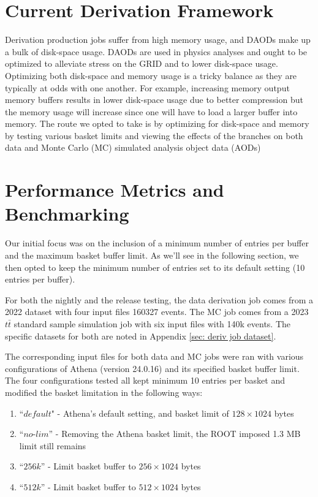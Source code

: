 \section{Current Derivation Framework}
Derivation production jobs suffer from high memory usage, and DAODs make up a bulk of disk-space usage. 
DAODs are used in physics analyses and ought to be optimized to alleviate stress on the GRID and to lower disk-space usage. 
Optimizing both disk-space and memory usage is a tricky balance as they are typically at odds with one another. 
For example, increasing memory output memory buffers results in lower disk-space usage due to better compression but the memory usage will increase since one will have to load a larger buffer into memory. 
The route we opted to take is by optimizing for disk-space and memory by testing various basket limits and viewing the effects of the branches on both data and Monte Carlo (MC) simulated analysis object data (AODs)

\section{Performance Metrics and Benchmarking}

Our initial focus was on the inclusion of a minimum number of entries per buffer and the maximum basket buffer limit.
As we'll see in the following section, we then opted to keep the minimum number of entries set to its default setting (10 entries per buffer). 


For both the nightly and the release testing, the data derivation job comes from a 2022 dataset with four input files 160327 events. 
The MC job comes from a 2023 $t\bar{t}$ standard sample simulation job with six input files with 140k events. 
The specific datasets for both are noted in Appendix \ref{sec: deriv job dataset}.

The corresponding input files for both data and MC jobs were ran with various configurations of Athena (version 24.0.16) and its specified basket buffer limit. 
The four configurations tested all kept minimum 10 entries per basket and modified the basket limitation in the following ways: 

\begin{enumerate}
    \item ``$\textit{default}$" - Athena's default setting, and basket limit of $128\times1024$ bytes
    \item ``$\textit{no-lim}$'' - Removing the Athena basket limit, the ROOT imposed 1.3 MB limit still remains
    \item ``$\textit{256k}$'' - Limit basket buffer to $256\times1024$ bytes
    \item ``$\textit{512k}$'' - Limit basket buffer to $512\times1024$ bytes
\end{enumerate}

